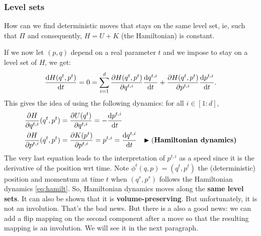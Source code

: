 \documentclass[english,graybox,envcountchap,envcountsame,sectrefs,shortlabels]{svmono}
\theoremstyle{style}
\newcommand{\eqsp}{}
\begin{document}
\subsubsection{Level sets}
How can we find deterministic moves that stays on the same level set, ie, such that $\Pi$ and consequently, $H=U+K$ (the Hamiltonian) is constant.

If we now let $(p,q)$ depend on a real parameter $t$ and we impose to stay on a level set of $H$, we get:
$$
\frac{\rmd H(q^t,p^t)}{\rmd t}=0=\sum_{i=1}^d \frac{\partial H(q^t,p^t)}{\partial q^{t,i}} \frac{\rmd q^{t,i}}{\rmd t}+\frac{\partial H(q^t,p^t)}{\partial p^{t,i}} \frac{\rmd p^{t,i}}{\rmd t}\eqsp.
$$
This gives the idea of using the following dynamics: for all $i \in [1:d]$,
\begin{align}
\frac{\partial H}{\partial q^{t,i}}(q^t,p^t)&=\frac{\partial U(q^t)}{\partial q^{t,i}}=-\frac{\mathrm{d} p^{t,i}}{\mathrm{d} t} \nonumber\\
\frac{\partial H}{\partial p^{t,i}}(q^t,p^t)&=\frac{\partial K(p^t)}{\partial p^{t,i}}=p^{t,i}=\frac{\mathrm{d} q^{t,i}}{\mathrm{d} t} \quad {\blacktriangleright \mbox{(\bf Hamiltonian dynamics)}} \label{eq:hamilt}
\end{align}
The very last equation leads to the interpretation of $p^{t,i}$ as a speed since it is the derivative of the position wrt time.
Note $\phi^t(q,p)=(q^t,p^t)$ the (deterministic) position and momentum at time $t$ when $(q^s,p^s)$ follows the Hamiltonian dynamics \eqref{eq:hamilt}. So, Hamiltonian dynamics moves along the {\bf same level sets}. It can also be shown that it is {\bf volume-preserving}. But unfortunately, it is not an involution. That's the bad news. But there is a also a good news: we can add a flip mapping on the second component after a move so that the resulting mapping is an involution. We will see it in the next paragraph.
\end{document}
